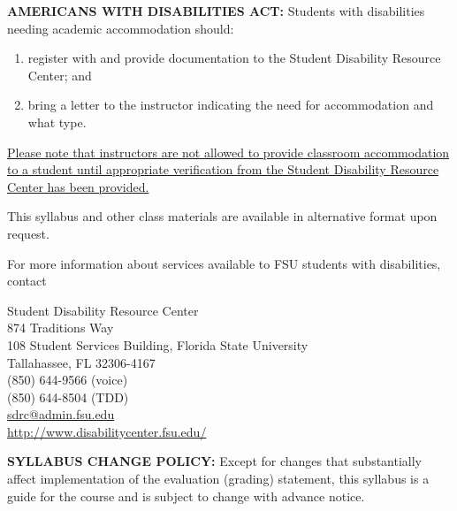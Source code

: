 \documentclass[12pt,oneside]{amsart}
\begin{document}
\noindent \textbf{AMERICANS WITH DISABILITIES ACT:}
Students with disabilities needing academic accommodation should:\vspace{-4.5mm}
\begin{enumerate}[label=(\arabic*), topsep=1.5mm, itemsep=1.5mm, ]
\item register with and provide documentation to the Student Disability Resource Center; and
\item bring a letter to the instructor indicating the need for accommodation and what type.
\end{enumerate}\vspace{-4.5mm}
\ul{Please note that instructors are not allowed to provide classroom accommodation to a student until appropriate verification from the Student Disability Resource Center has been provided.}

\noindent This syllabus and other class materials are available in alternative format upon request.

\noindent For more information about services available to FSU students with disabilities, contact

{\centering
 Student Disability Resource Center
\\
874 Traditions Way
\\
108 Student Services Building, 
Florida State University
\\
Tallahassee, FL 32306-4167
\\
(850) 644-9566 (voice)
\\
(850) 644-8504 (TDD)
\\
\url{sdrc@admin.fsu.edu}
\\
\url{http://www.disabilitycenter.fsu.edu/}
\\
}

\vspace{12pt}

\noindent \textbf{SYLLABUS CHANGE POLICY:}
Except for changes that substantially affect implementation of the evaluation (grading) statement, this syllabus is a guide for the course and is subject to change with advance notice.
\end{document}
